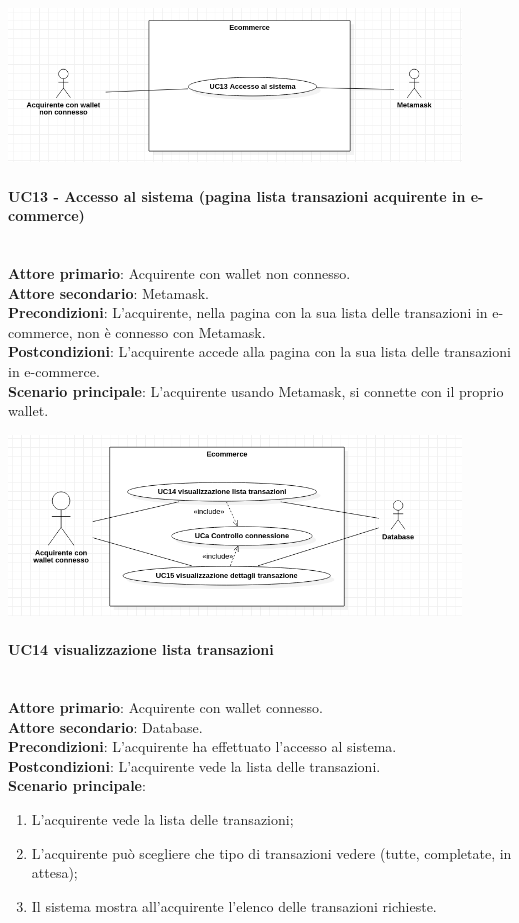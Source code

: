 \documentclass[a4paper, 12pt]{article}
\begin{document}
\includegraphics[width=0.9\textwidth]{UC_ECA1}

\paragraph{UC13 - Accesso al sistema (pagina lista transazioni acquirente in e-commerce)}\\
\textbf{Attore primario}: Acquirente con wallet non connesso.\\
\textbf{Attore secondario}: Metamask.\\
\textbf{Precondizioni}: L'acquirente, nella pagina con la sua lista delle transazioni in e-commerce, non è connesso con Metamask.\\
\textbf{Postcondizioni}: L'acquirente accede alla pagina con la sua lista delle transazioni in e-commerce.\\
\textbf{Scenario principale}:
L'acquirente usando Metamask, si connette con il proprio wallet.

\includegraphics[width=0.9\textwidth]{UC_ECA2}

\paragraph{UC14 visualizzazione lista transazioni}\\
\textbf{Attore primario}: Acquirente con wallet connesso. \\
\textbf{Attore secondario}: Database. \\
\textbf{Precondizioni}: L'acquirente ha effettuato l'accesso al sistema.\\
\textbf{Postcondizioni}:  L'acquirente vede la lista delle transazioni.\\
\textbf{Scenario principale}:
\begin{enumerate}
\item L'acquirente vede la lista delle transazioni;
\item L'acquirente può scegliere che tipo di transazioni vedere (tutte, completate, in attesa);
\item Il sistema mostra all'acquirente l'elenco delle transazioni richieste.
\end{enumerate}
\end{document}

